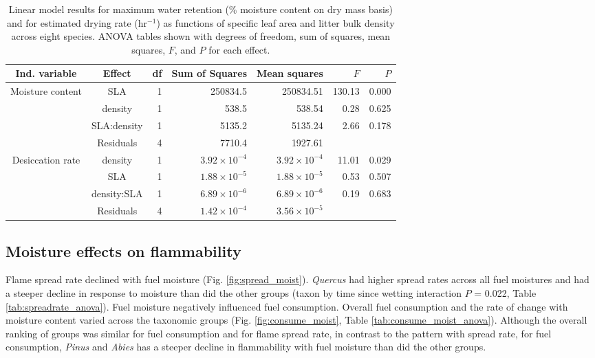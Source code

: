 \documentclass[letterpaper,12pt]{article}
\begin{document}
\begin{table}[h]
  \caption{Linear model results for maximum water retention (\% moisture
    content on dry mass basis) and for estimated drying rate (hr$^{-1}$) as
    functions of specific leaf area and litter bulk density across eight
    species. ANOVA tables shown with degrees of freedom, sum of squares, mean
    squares, $F$, and $P$ for each effect.}
  \label{tab:mc_di_anova}
\centering

\begin{tabular}{ccrrrrr}
  \toprule
Ind. variable & Effect & df & Sum of Squares & Mean squares & $F$ & $P$ \\ 
  \midrule
Moisture content & SLA & 1 & 250834.5 & 250834.51 & 130.13 & 0.000 \\ 
  & density & 1 & 538.5 & 538.54 & 0.28 & 0.625 \\ 
  & SLA:density & 1 & 5135.2 & 5135.24 & 2.66 & 0.178 \\ 
  & Residuals & 4 & 7710.4 & 1927.61 &  &  \\ 
  \midrule
  
Desiccation rate & density & 1 & $3.92 \times 10^{-4}$ & $3.92 \times 10^{-4}$ & 11.01 & 0.029 \\ 
 &  SLA & 1 & $1.88 \times 10^{-5}$ & $1.88 \times 10^{-5}$ & 0.53 & 0.507 \\ 
 &  density:SLA & 1 & $6.89 \times 10^{-6}$ & $6.89 \times 10^{-6}$ & 0.19 & 0.683 \\ 
 &  Residuals & 4 & $1.42 \times 10^{-4}$ & $3.56 \times 10^{-5}$ &  &  \\ 
   \bottomrule

\end{tabular}
\end{table}


\subsection*{Moisture effects on flammability}


Flame spread rate declined with fuel moisture (Fig. \ref{fig:spread_moist}).
\emph{Quercus} had higher spread rates across all fuel moistures and had a
steeper decline in response to moisture than did the other groups (taxon by
time since wetting interaction $P$ = 0.022, Table \ref{tab:spreadrate_anova}).
Fuel moisture negatively influenced fuel consumption. Overall fuel consumption
and the rate of change with moisture content varied across the taxonomic groups
(Fig. \ref{fig:consume_moist}, Table \ref{tab:consume_moist_anova}). Although
the overall ranking of groups was similar for fuel consumption and for flame
spread rate, in contrast to the pattern with spread rate, for fuel consumption,
\emph{Pinus} and \emph{Abies} has a steeper decline in flammability with fuel
moisture than did the other groups.
\end{document}
